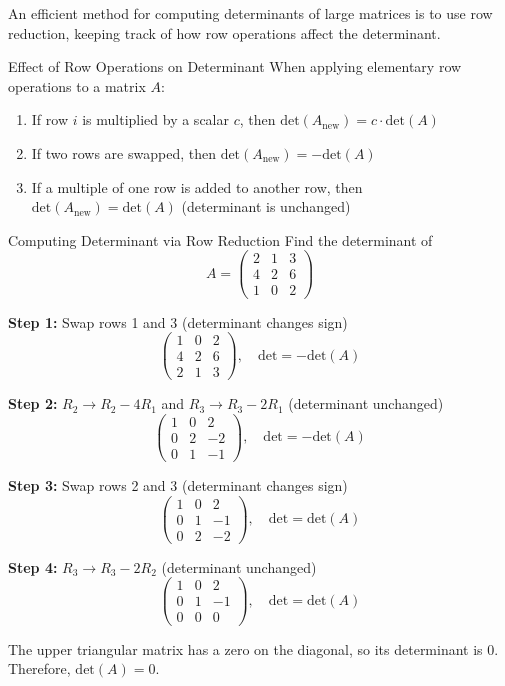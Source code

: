 \documentclass[12pt,a4paper]{article}
\newcommand{\Det}{\text{det}}
\begin{document}
	An efficient method for computing determinants of large matrices is to use row reduction, keeping track of how row operations affect the determinant.
	
	\begin{proposition}{Effect of Row Operations on Determinant}
		When applying elementary row operations to a matrix $A$:
		\begin{enumerate}[label=(\roman*)]
			\item If row $i$ is multiplied by a scalar $c$, then $\Det(A_{\text{new}}) = c \cdot \Det(A)$
			\item If two rows are swapped, then $\Det(A_{\text{new}}) = -\Det(A)$
			\item If a multiple of one row is added to another row, then $\Det(A_{\text{new}}) = \Det(A)$ (determinant is unchanged)
		\end{enumerate}
	\end{proposition}
	
	\begin{example}{Computing Determinant via Row Reduction}
		Find the determinant of 
		\[
		A = \begin{pmatrix}
			2 & 1 & 3 \\
			4 & 2 & 6 \\
			1 & 0 & 2
		\end{pmatrix}
		\]
		
		\textbf{Step 1:} Swap rows 1 and 3 (determinant changes sign)
		\[
		\begin{pmatrix}
			1 & 0 & 2 \\
			4 & 2 & 6 \\
			2 & 1 & 3
		\end{pmatrix}, \quad \Det = -\Det(A)
		\]
		
		\textbf{Step 2:} $R_2 \to R_2 - 4R_1$ and $R_3 \to R_3 - 2R_1$ (determinant unchanged)
		\[
		\begin{pmatrix}
			1 & 0 & 2 \\
			0 & 2 & -2 \\
			0 & 1 & -1
		\end{pmatrix}, \quad \Det = -\Det(A)
		\]
		
		\textbf{Step 3:} Swap rows 2 and 3 (determinant changes sign)
		\[
		\begin{pmatrix}
			1 & 0 & 2 \\
			0 & 1 & -1 \\
			0 & 2 & -2
		\end{pmatrix}, \quad \Det = \Det(A)
		\]
		
		\textbf{Step 4:} $R_3 \to R_3 - 2R_2$ (determinant unchanged)
		\[
		\begin{pmatrix}
			1 & 0 & 2 \\
			0 & 1 & -1 \\
			0 & 0 & 0
		\end{pmatrix}, \quad \Det = \Det(A)
		\]
		
		The upper triangular matrix has a zero on the diagonal, so its determinant is 0. Therefore, $\Det(A) = 0$.
	\end{example}
	
\end{document}
